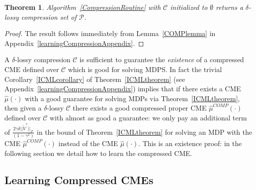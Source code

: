 \documentclass[letterpaper]{article}
\newtheorem{theorem}{Theorem}[section]
\newcommand{\cC}{{\mathcal C}}
\newcommand{\cF}{{\mathcal F}}
\newcommand{\cP}{{\mathcal P}}
\begin{document}
\begin{theorem} \label{CompressionTheorem}
Algorithm~\ref{CompressionRoutine} with $\cC$ initialized to $\emptyset$ returns a $\delta$-lossy compression set of $\cP$.
\end{theorem}
\begin{proof} The result follows immediately from Lemma~\ref{COMPlemma} in Appendix~\ref{learningCompressionAppendix}.
\end{proof}

A $\delta$-lossy compression $\cC$  is sufficient to guarantee the \emph{existence} of a compressed CME defined over $\cC$ which is good for solving MDPS. In fact the trivial Corollary~\ref{ICMLcorollary} of Theorem~\ref{ICMLtheorem} (see Appendix~\ref{learningCompressionAppendix}) implies that if there exists a CME $\hat\mu(\cdot)$ with a good guarantee for solving MDPs via Theorem~\ref{ICMLtheorem}, then given a $\delta$-lossy $\cC$ there exists a good compressed proper CME $\hat\mu^{COMP}(\cdot)$ defined over $\cC$ with almost as good a guarantee: we only pay an additional term of $\frac{2\gamma \delta||\tilde V^*||_{\cF}}{(1-\gamma^2)}$ in the bound of Theorem~\ref{ICMLtheorem} for solving an MDP with the CME $\hat\mu^{COMP}(\cdot)$ instead of the CME $\hat\mu(\cdot)$. This is an existence proof: in the following section we detail how to learn the compressed CME.

\subsection{Learning Compressed CMEs} \label{LearningCompressedModel}
\end{document}
